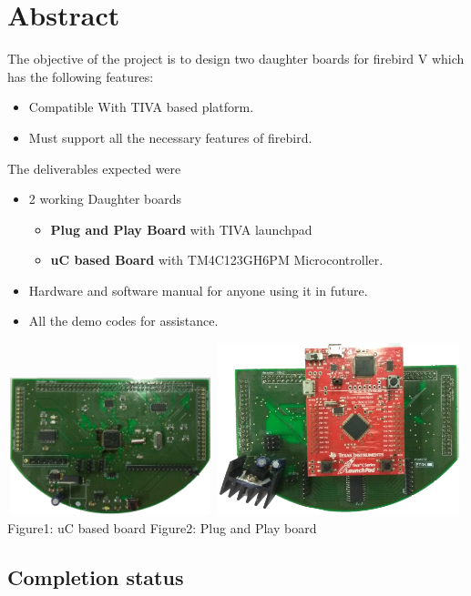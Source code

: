 \documentclass[a4paper,12pt,oneside]{book}
\begin{document}
\section*{Abstract}
The objective of the project is to design two daughter boards for firebird V
which has the following features:
\begin{itemize}
	\item Compatible With TIVA based platform.
	\item Must support all the necessary features of firebird.
\end{itemize}
The deliverables expected were
\begin{itemize}
	\item 2 working Daughter boards 
		\begin{itemize}
			\item \textbf{Plug and Play Board} with TIVA launchpad
			\item \textbf{uC based Board} with TM4C123GH6PM Microcontroller.
		\end{itemize}
	\item Hardware and software manual for anyone using it in future.
	\item All the demo codes for assistance.
\end{itemize}
\includegraphics[width=6cm, height=4cm]{Images/uC}
\includegraphics[width=7cm, height=5cm]{Images/PP}\\
Figure1: uC based board
\hspace{2cm}
Figure2: Plug and Play board
\subsection*{Completion status}
\end{document}
